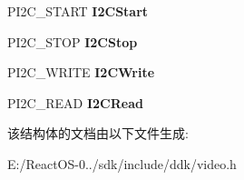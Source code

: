 \begin{DoxyCompactItemize}
P\+I2\+C\+\_\+\+S\+T\+A\+RT {\bfseries I2\+C\+Start}
\item 
\mbox{\label{struct___v_i_d_e_o___p_o_r_t___i2_c___i_n_t_e_r_f_a_c_e_a8127fa6174848a7d2decb974a63d20d4}} 
P\+I2\+C\+\_\+\+S\+T\+OP {\bfseries I2\+C\+Stop}
\item 
\mbox{\label{struct___v_i_d_e_o___p_o_r_t___i2_c___i_n_t_e_r_f_a_c_e_afa43e814b834a21c0f5bb5876cb0aae5}} 
P\+I2\+C\+\_\+\+W\+R\+I\+TE {\bfseries I2\+C\+Write}
\item 
\mbox{\label{struct___v_i_d_e_o___p_o_r_t___i2_c___i_n_t_e_r_f_a_c_e_a210793760cf564ebea098b25f450d40f}} 
P\+I2\+C\+\_\+\+R\+E\+AD {\bfseries I2\+C\+Read}
\end{DoxyCompactItemize}


该结构体的文档由以下文件生成\+:\begin{DoxyCompactItemize}
\item 
E\+:/\+React\+O\+S-\/0../sdk/include/ddk/video.\+h\end{DoxyCompactItemize}
